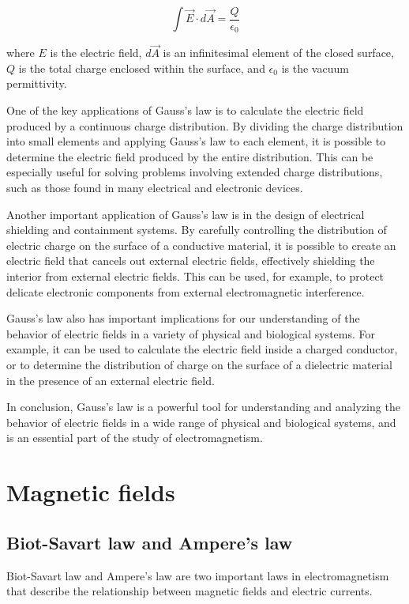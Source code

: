 \documentclass{article}
\begin{document}
\[\int \vec{E} \cdot d\vec{A} = \frac{Q}{\epsilon_0}\]

where $E$ is the electric field, $d\vec{A}$ is an infinitesimal element of the closed
surface, $Q$ is the total charge enclosed within the surface, and $\epsilon_0$ is the
vacuum permittivity.

One of the key applications of Gauss's law is to calculate the electric field
produced by a continuous charge distribution. By dividing the charge
distribution into small elements and applying Gauss's law to each element, it
is possible to determine the electric field produced by the entire
distribution. This can be especially useful for solving problems involving
extended charge distributions, such as those found in many electrical and
electronic devices.

Another important application of Gauss's law is in the design of electrical
shielding and containment systems. By carefully controlling the distribution of
electric charge on the surface of a conductive material, it is possible to
create an electric field that cancels out external electric fields, effectively
shielding the interior from external electric fields. This can be used, for
example, to protect delicate electronic components from external
electromagnetic interference.

Gauss's law also has important implications for our understanding of the
behavior of electric fields in a variety of physical and biological systems.
For example, it can be used to calculate the electric field inside a charged
conductor, or to determine the distribution of charge on the surface of a
dielectric material in the presence of an external electric field.

In conclusion, Gauss's law is a powerful tool for understanding and analyzing
the behavior of electric fields in a wide range of physical and biological
systems, and is an essential part of the study of electromagnetism.

\section{Magnetic fields} %
\label{sec:Magnetic fields}
\subsection{Biot-Savart law and Ampere's law} %
\label{ssub:Biot-Savart law and Ampere's law}
Biot-Savart law and Ampere's law are two important laws in electromagnetism
that describe the relationship between magnetic fields and electric currents.
\end{document}
